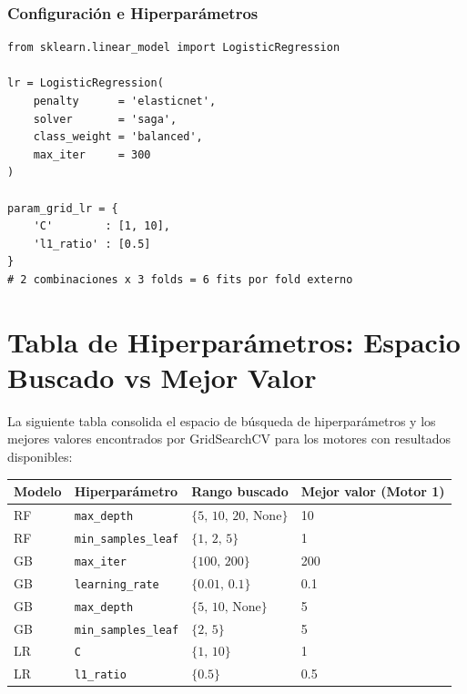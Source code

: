 \documentclass[12pt,a4paper]{article}
\begin{document}
\subsubsection{Configuraci\'{o}n e Hiperpar\'{a}metros}

\begin{lstlisting}[caption={Configuraci\'{o}n de Regresi\'{o}n Log\'{i}stica}]
from sklearn.linear_model import LogisticRegression

lr = LogisticRegression(
    penalty      = 'elasticnet',
    solver       = 'saga',
    class_weight = 'balanced',
    max_iter     = 300
)

param_grid_lr = {
    'C'        : [1, 10],
    'l1_ratio' : [0.5]
}
# 2 combinaciones x 3 folds = 6 fits por fold externo
\end{lstlisting}

\section{Tabla de Hiperpar\'{a}metros: Espacio Buscado vs Mejor Valor}

La siguiente tabla consolida el espacio de b\'{u}squeda de hiperpar\'{a}metros y los
mejores valores encontrados por GridSearchCV para los motores con resultados
disponibles:

\begin{center}
\begin{tabular}{llll}
\toprule
\textbf{Modelo} & \textbf{Hiperpar\'{a}metro} & \textbf{Rango buscado} & \textbf{Mejor valor (Motor 1)} \\
\midrule
\rowcolor{rowgray}
RF & \texttt{max\_depth} & $\{5,\, 10,\, 20,\, \text{None}\}$ & 10 \\
RF & \texttt{min\_samples\_leaf} & $\{1,\, 2,\, 5\}$ & 1 \\
\rowcolor{rowgray}
GB & \texttt{max\_iter} & $\{100,\, 200\}$ & 200 \\
GB & \texttt{learning\_rate} & $\{0.01,\, 0.1\}$ & 0.1 \\
\rowcolor{rowgray}
GB & \texttt{max\_depth} & $\{5,\, 10,\, \text{None}\}$ & 5 \\
GB & \texttt{min\_samples\_leaf} & $\{2,\, 5\}$ & 5 \\
\rowcolor{rowgray}
LR & \texttt{C} & $\{1,\, 10\}$ & 1 \\
LR & \texttt{l1\_ratio} & $\{0.5\}$ & 0.5 \\
\bottomrule
\end{tabular}
\end{center}
\end{document}
